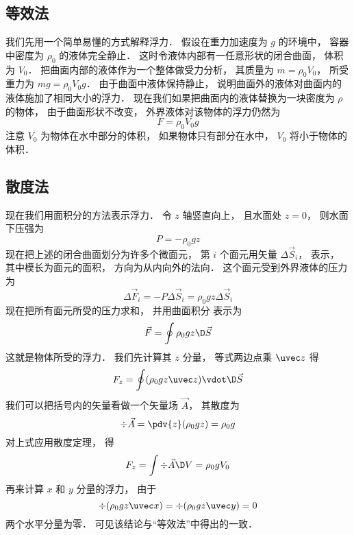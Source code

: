 
\subsection{等效法}

我们先用一个简单易懂的方式解释浮力． 假设在重力加速度为 $g$ 的环境中， 容器中密度为 $\rho_0$ 的液体完全静止． 这时令液体内部有一任意形状的闭合曲面， 体积为 $V_0$． 把曲面内部的液体作为一个整体做受力分析， 其质量为 $m = \rho_0 V_0$， 所受重力为 $mg = \rho_0 V_0 g$． 由于曲面中液体保持静止， 说明曲面外的液体对曲面内的液体施加了相同大小的浮力． 现在我们如果把曲面内的液体替换为一块密度为 $\rho$ 的物体， 由于曲面形状不改变， 外界液体对该物体的浮力仍然为
\begin{equation}
F = \rho_0 V_0 g
\end{equation}
注意 $V_0$ 为物体在水中部分的体积， 如果物体只有部分在水中， $V_0$ 将小于物体的体积．

\subsection{散度法}

现在我们用面积分的方法表示浮力． 令 $z$ 轴竖直向上， 且水面处 $z = 0$， 则水面下压强为
\begin{equation}
P = -\rho_0 g z
\end{equation}
现在把上述的闭合曲面划分为许多个微面元， 第 $i$ 个面元用矢量 $\Delta \vec S_i$， 表示， 其中模长为面元的面积， 方向为从内向外的法向． 这个面元受到外界液体的压力为
\begin{equation}
\Delta \vec F_i = -P\Delta \vec S_i = \rho_0 g z \Delta \vec S_i
\end{equation}
现在把所有面元所受的压力求和， 并用曲面积分%
表示为
\begin{equation}
\vec F = \oint \rho_0 g z \D \vec S
\end{equation}
这就是物体所受的浮力． 我们先计算其 $z$ 分量， 等式两边点乘 $\uvec z$ 得
\begin{equation}
F_z = \oint (\rho_0 g z \uvec z)\vdot \D \vec S
\end{equation}
我们可以把括号内的矢量看做一个矢量场 $\vec A$， 其散度为
\begin{equation}
\div \vec A = \pdv{z}(\rho_0 g z) = \rho_0 g
\end{equation}
对上式应用散度定理， 得
\begin{equation}
F_z = \int \div\vec A \D V = \rho_0 g V_0
\end{equation}
再来计算 $x$ 和 $y$ 分量的浮力， 由于
\begin{equation}
\div (\rho_0 g z\uvec x) = \div (\rho_0 g z\uvec y) = 0
\end{equation}
两个水平分量为零． 可见该结论与“等效法”中得出的一致．


